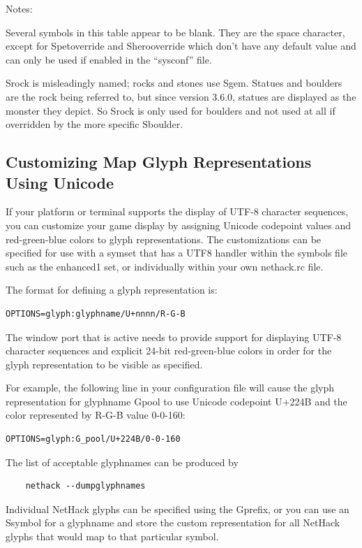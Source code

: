 \documentclass[titlepage]{article}
\begin{document}
Notes:

Several symbols in this table appear to be blank.
They are the space character, except for S\textunderscore pet\textunderscore override
and S\textunderscore hero\textunderscore override which don't have any default value
and can only be used if enabled in the ``sysconf'' file.

S\textunderscore rock is misleadingly named; rocks and stones use S\textunderscore gem.
Statues and boulders are the rock being referred to, but since
version 3.6.0, statues are displayed as the monster they depict.
So S\textunderscore rock is only used for boulders and not used at all if
overridden by the more specific S\textunderscore boulder.

\subsection*{Customizing Map Glyph Representations Using Unicode}

If your platform or terminal supports the display of UTF-8 character
sequences, you can customize your game display by assigning Unicode
codepoint values and red-green-blue colors to glyph
representations. The customizations can be specified for use with a symset that
has a UTF8 handler within the symbols file such as the enhanced1 set, or
individually within your own nethack.rc file.

The format for defining a glyph representation is:\\
\begin{verbatim}
OPTIONS=glyph:glyphname/U+nnnn/R-G-B
\end{verbatim}

The window port that is active needs to provide support for displaying UTF-8
character sequences and explicit 24-bit red-green-blue colors in order for the glyph
representation to be visible as specified.

For example, the following line in your configuration file will cause
the glyph representation for glyphname G\textunderscore pool to use Unicode codepoint
U+224B and the color represented by R-G-B value 0-0-160:\\
\begin{verbatim}
OPTIONS=glyph:G_pool/U+224B/0-0-160
\end{verbatim}

The list of acceptable glyphnames can be produced by
\begin{verbatim}
    nethack --dumpglyphnames
\end{verbatim}
Individual NetHack glyphs can be specified using the G\textunderscore prefix,
or you can use an S\textunderscore symbol for a glyphname and store the custom
representation for all NetHack glyphs that would map to that
particular symbol.
\end{document}
